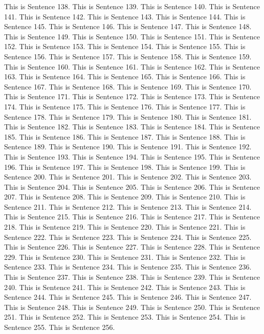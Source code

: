 \documentclass{article}
\begin{document}
This is Sentence 138.
This is Sentence 139.
This is Sentence 140.
This is Sentence 141.
This is Sentence 142.
This is Sentence 143.
This is Sentence 144.
This is Sentence 145.
This is Sentence 146.
This is Sentence 147.
This is Sentence 148.
This is Sentence 149.
This is Sentence 150.
This is Sentence 151.
This is Sentence 152.
This is Sentence 153.
This is Sentence 154.
This is Sentence 155.
This is Sentence 156.
This is Sentence 157.
This is Sentence 158.
This is Sentence 159.
This is Sentence 160.
This is Sentence 161.
This is Sentence 162.
This is Sentence 163.
This is Sentence 164.
This is Sentence 165.
This is Sentence 166.
This is Sentence 167.
This is Sentence 168.
This is Sentence 169.
This is Sentence 170.
This is Sentence 171.
This is Sentence 172.
This is Sentence 173.
This is Sentence 174.
This is Sentence 175.
This is Sentence 176.
This is Sentence 177.
This is Sentence 178.
This is Sentence 179.
This is Sentence 180.
This is Sentence 181.
This is Sentence 182.
This is Sentence 183.
This is Sentence 184.
This is Sentence 185.
This is Sentence 186.
This is Sentence 187.
This is Sentence 188.
This is Sentence 189.
This is Sentence 190.
This is Sentence 191.
This is Sentence 192.
This is Sentence 193.
This is Sentence 194.
This is Sentence 195.
This is Sentence 196.
This is Sentence 197.
This is Sentence 198.
This is Sentence 199.
This is Sentence 200.
This is Sentence 201.
This is Sentence 202.
This is Sentence 203.
This is Sentence 204.
This is Sentence 205.
This is Sentence 206.
This is Sentence 207.
This is Sentence 208.
This is Sentence 209.
This is Sentence 210.
This is Sentence 211.
This is Sentence 212.
This is Sentence 213.
This is Sentence 214.
This is Sentence 215.
This is Sentence 216.
This is Sentence 217.
This is Sentence 218.
This is Sentence 219.
This is Sentence 220.
This is Sentence 221.
This is Sentence 222.
This is Sentence 223.
This is Sentence 224.
This is Sentence 225.
This is Sentence 226.
This is Sentence 227.
This is Sentence 228.
This is Sentence 229.
This is Sentence 230.
This is Sentence 231.
This is Sentence 232.
This is Sentence 233.
This is Sentence 234.
This is Sentence 235.
This is Sentence 236.
This is Sentence 237.
This is Sentence 238.
This is Sentence 239.
This is Sentence 240.
This is Sentence 241.
This is Sentence 242.
This is Sentence 243.
This is Sentence 244.
This is Sentence 245.
This is Sentence 246.
This is Sentence 247.
This is Sentence 248.
This is Sentence 249.
This is Sentence 250.
This is Sentence 251.
This is Sentence 252.
This is Sentence 253.
This is Sentence 254.
This is Sentence 255.
This is Sentence 256.
\end{document}
